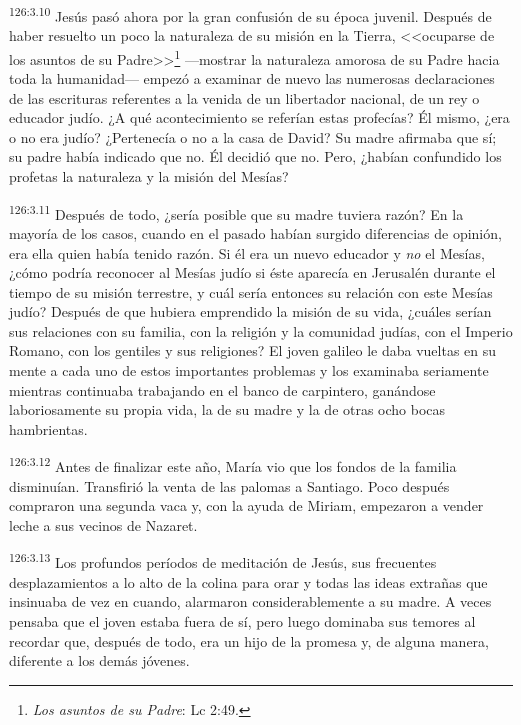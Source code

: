 \par 
\textsuperscript{126:3.10} Jesús pasó ahora por la gran confusión de su época juvenil. Después de haber resuelto un poco la naturaleza de su misión en la Tierra, <<ocuparse de los asuntos de su Padre>>\footnote{\textit{Los asuntos de su Padre}: Lc 2:49.} ---mostrar la naturaleza amorosa de su Padre hacia toda la humanidad--- empezó a examinar de nuevo las numerosas declaraciones de las escrituras referentes a la venida de un libertador nacional, de un rey o educador judío. ¿A qué acontecimiento se referían estas profecías? Él mismo, ¿era o no era judío? ¿Pertenecía o no a la casa de David? Su madre afirmaba que sí; su padre había indicado que no. Él decidió que no. Pero, ¿habían confundido los profetas la naturaleza y la misión del Mesías?

\par 
\textsuperscript{126:3.11} Después de todo, ¿sería posible que su madre tuviera razón? En la mayoría de los casos, cuando en el pasado habían surgido diferencias de opinión, era ella quien había tenido razón. Si él era un nuevo educador y \textit{no} el Mesías, ¿cómo podría reconocer al Mesías judío si éste aparecía en Jerusalén durante el tiempo de su misión terrestre, y cuál sería entonces su relación con este Mesías judío? Después de que hubiera emprendido la misión de su vida, ¿cuáles serían sus relaciones con su familia, con la religión y la comunidad judías, con el Imperio Romano, con los gentiles y sus religiones? El joven galileo le daba vueltas en su mente a cada uno de estos importantes problemas y los examinaba seriamente mientras continuaba trabajando en el banco de carpintero, ganándose laboriosamente su propia vida, la de su madre y la de otras ocho bocas hambrientas.

\par 
\textsuperscript{126:3.12} Antes de finalizar este año, María vio que los fondos de la familia disminuían. Transfirió la venta de las palomas a Santiago. Poco después compraron una segunda vaca y, con la ayuda de Miriam, empezaron a vender leche a sus vecinos de Nazaret.

\par 
\textsuperscript{126:3.13} Los profundos períodos de meditación de Jesús, sus frecuentes desplazamientos a lo alto de la colina para orar y todas las ideas extrañas que insinuaba de vez en cuando, alarmaron considerablemente a su madre. A veces pensaba que el joven estaba fuera de sí, pero luego dominaba sus temores al recordar que, después de todo, era un hijo de la promesa y, de alguna manera, diferente a los demás jóvenes.


